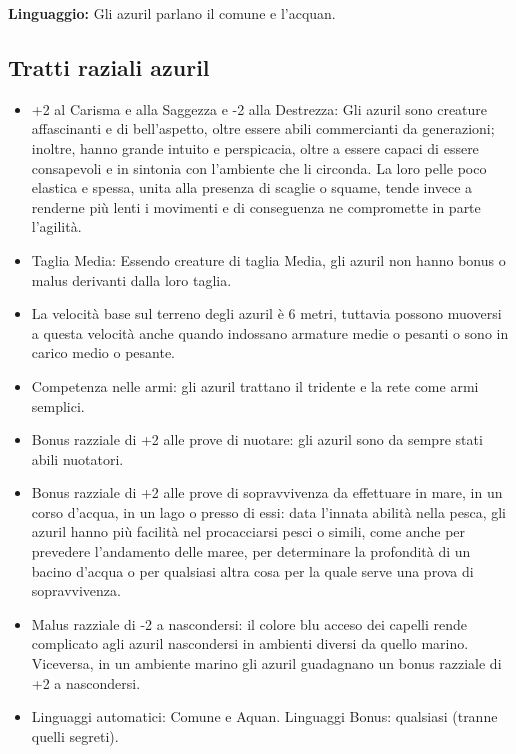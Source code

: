 \documentclass[10pt, a4paper]{report}
\begin{document}
\begin{multicols}{2}
\textbf{Linguaggio:} Gli azuril parlano il comune e l'acquan. 



\subsection*{Tratti raziali azuril}
\begin{itemize}
	\item +2 al Carisma e alla Saggezza e -2 alla Destrezza: Gli azuril sono creature affascinanti e di bell’aspetto, oltre essere abili commercianti da generazioni; inoltre, hanno grande intuito e perspicacia, oltre a essere capaci di essere consapevoli e in sintonia con l’ambiente che li circonda. La loro pelle poco elastica e spessa, unita alla presenza di scaglie o squame, tende invece a renderne più lenti i movimenti e di conseguenza ne compromette in parte l’agilità.
	\item Taglia Media: Essendo creature di taglia Media, gli azuril non hanno bonus o malus derivanti dalla loro taglia.
	\item La velocità base sul terreno degli azuril è 6 metri, tuttavia possono muoversi a questa velocità anche quando indossano armature medie o pesanti o sono in carico medio o pesante.
	\item Competenza nelle armi: gli azuril trattano il tridente e la rete come armi semplici.
	\item Bonus razziale di +2 alle prove di nuotare: gli azuril sono da sempre stati abili nuotatori.
	\item Bonus razziale di +2 alle prove di sopravvivenza da effettuare in mare, in un corso d’acqua, in un lago o presso di essi: data l’innata abilità nella pesca, gli azuril hanno più facilità nel procacciarsi pesci o simili, come anche per prevedere l’andamento delle maree, per determinare la profondità di un bacino d’acqua o per qualsiasi altra cosa per la quale serve una prova di sopravvivenza.
	\item Malus razziale di -2 a nascondersi: il colore blu acceso dei capelli rende complicato agli azuril nascondersi in ambienti diversi da quello marino. Viceversa, in un ambiente marino gli azuril guadagnano un bonus razziale di +2 a nascondersi.             
	\item Linguaggi automatici: Comune e Aquan. Linguaggi Bonus: qualsiasi (tranne quelli segreti).	
\end{itemize}

\end{multicols}
\end{document}
